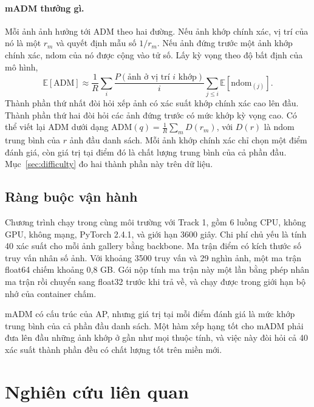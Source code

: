 \documentclass[11pt,a4paper]{article}
\newcommand{\ndom}{\mathrm{ndom}}
\begin{document}
\paragraph{mADM thưởng gì.} Mỗi ảnh ảnh hưởng tới ADM theo hai đường. Nếu ảnh khớp chính xác, vị trí của nó là một $r_m$ và quyết định mẫu số $1/r_m$. Nếu ảnh đứng trước một ảnh khớp chính xác, ndom của nó được cộng vào tử số. Lấy kỳ vọng theo độ bất định của mô hình,
\begin{equation}
\mathbb{E}[\mathrm{ADM}]\approx\frac{1}{R}\sum_{i}\frac{P(\text{ảnh ở vị trí }i\text{ khớp})}{i}\sum_{j\le i}\mathbb{E}[\ndom_{(j)}].
\label{eq:eadm}
\end{equation}
Thành phần thứ nhất đòi hỏi xếp ảnh có xác suất khớp chính xác cao lên đầu. Thành phần thứ hai đòi hỏi các ảnh đứng trước có mức khớp kỳ vọng cao. Có thể viết lại ADM dưới dạng $\mathrm{ADM}(q)=\frac1R\sum_m D(r_m)$, với $D(r)$ là ndom trung bình của $r$ ảnh đầu danh sách. Mỗi ảnh khớp chính xác chỉ chọn một điểm đánh giá, còn giá trị tại điểm đó là chất lượng trung bình của cả phần đầu. Mục~\ref{sec:difficulty} đo hai thành phần này trên dữ liệu.

\subsection{Ràng buộc vận hành}

Chương trình chạy trong cùng môi trường với Track 1, gồm 6 luồng CPU, không GPU, không mạng, PyTorch 2.4.1, và giới hạn 3600 giây. Chi phí chủ yếu là tính 40 xác suất cho mỗi ảnh gallery bằng backbone. Ma trận điểm có kích thước số truy vấn nhân số ảnh. Với khoảng 3500 truy vấn và 29 nghìn ảnh, một ma trận float64 chiếm khoảng 0,8 GB. Gói nộp tính ma trận này một lần bằng phép nhân ma trận rồi chuyển sang float32 trước khi trả về, và chạy được trong giới hạn bộ nhớ của container chấm.

\begin{ghichu}
mADM có cấu trúc của AP, nhưng giá trị tại mỗi điểm đánh giá là mức khớp trung bình của cả phần đầu danh sách. Một hàm xếp hạng tốt cho mADM phải đưa lên đầu những ảnh khớp ở gần như mọi thuộc tính, và việc này đòi hỏi cả 40 xác suất thành phần đều có chất lượng tốt trên miền mới.
\end{ghichu}

\section{Nghiên cứu liên quan}
\end{document}
